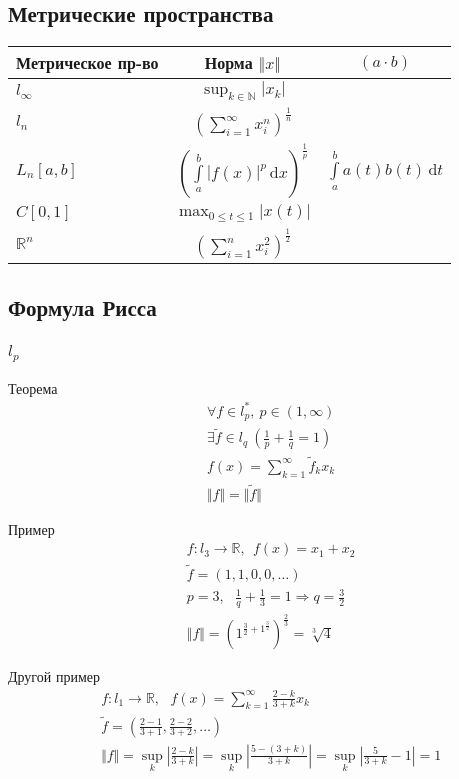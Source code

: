 \documentclass{article}[12pt]
\renewcommand{\d}{\,\mathrm{d}}
\newcommand{\R}{\mathbb{R}}
\newcommand{\N}{\mathbb{N}}
\begin{document}
\subsection{Метрические пространства}
\begin{tabular}{l|c|c}
    Метрическое пр-во & Норма $\Vert x \Vert$ & $(a\cdot b)$ \\\hline
    $l_{\infty}$ & $\sup_{k\in\N}|x_{k}|$ \\\hline
    $l_{n}$ &
    $\left(\sum\limits_{i=1}^{\infty}x_{i}^{n}\right)^{\frac{1}{n}}$ \\\hline
    $L_{n}[a,b]$ &
    $\left(\int\limits_{a}^{b}|f(x)|^{p}\d{x}\right)^{\frac{1}{p}}$ &
    $\int\limits_{a}^{b}a(t)b(t)\d{t}$\\\hline
    $C[0,1]$ & $\max_{0\leqslant t\leqslant 1}|x(t)|$ \\\hline
    $\R^{n}$ & $\left(\sum\limits_{i=1}^{n}x_{i}^{2}\right)^{\frac{1}{2}}$
\end{tabular}

\subsection{Формула Рисса}
\subsubsection{$l_{p}$}
Теорема
\begin{eqnarray*}
    &&\forall f\in l^{*}_{p},\ p\in(1,\infty)\\
    &&\exists \widetilde{f}\in l_{q}\ \left(\frac{1}{p}+\frac{1}{q}=1\right)\\
    &&f(x)=\sum\limits_{k=1}^{\infty}\widetilde{f}_{k}x_{k}\\
    &&\Vert f \Vert =\Vert \widetilde{f} \Vert
\end{eqnarray*}

Пример
\begin{eqnarray*}
    &&f:l_{3}\to\R,\ \ f(x)=x_{1}+x_{2}\\
    &&\widetilde{f}=(1,1,0,0,\ldots)\\
    &&p=3,\ \ \ \frac{1}{q}+\frac{1}{3}=1\Rightarrow q=\frac{3}{2}\\
    &&\Vert f \Vert =\left(1^{\frac{3}{2}+1^{\frac{3}{2}}}\right)^{\frac{2}{3}}
    =\sqrt[3]{4}
\end{eqnarray*}

Другой пример
\begin{eqnarray*}
    &&f:l_{1}\to\R
    ,\ \ \ f(x)=\sum\limits_{k=1}^{\infty}\frac{2-k}{3+k}x_{k}\\
    &&\widetilde{f}=\left(\frac{2-1}{3+1},\frac{2-2}{3+2},\ldots\right)\\
    &&\Vert f \Vert =\sup_{k}\left|\frac{2-k}{3+k}\right|
    =\sup_{k}\left|\frac{5-(3+k)}{3+k}\right|
    =\sup_{k}\left|\frac{5}{3+k}-1\right|=1
\end{eqnarray*}
\end{document}
